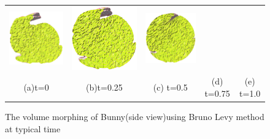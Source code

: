 \documentclass[runningheads]{llncs}
\begin{document}
{\begin{figure}[!htbp]
\begin{tabular}{ccccc}
\includegraphics[height=0.2\textwidth]{./figs/bunny_bruno_morph/h.png}&
\includegraphics[height=0.2\textwidth]{./figs/bunny_bruno_morph/i.png}&
\includegraphics[height=0.2\textwidth]{./figs/bunny_bruno_morph/j.png}\\
(a)t=0 &(b)t=0.25 &(c) t=0.5 &(d) t=0.75 &(e) t=1.0\\
\end{tabular}
  \caption{The volume morphing of Bunny(side view)using Bruno Levy method at typical time}
  \label{fig:bunny_bruno_morph}
\end{figure}
}
\end{document}
